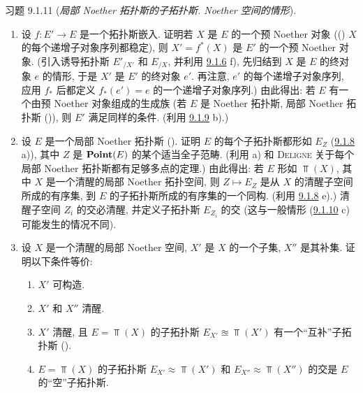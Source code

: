 \begin{enonce*}[remark]{习题 9.1.11}
(\emph{局部 Noether 拓扑斯的子拓扑斯. Noether 空间的情形}).
\begin{enumerate}
\renewcommand{\theenumi}{\alph{enumi}}
\renewcommand{\labelenumi}{\theenumi)}
\item 设 $f:E'\rightarrow E$ 是一个拓扑斯嵌入.
证明若 $X$ 是 $E$ 的一个预 Noether 对象
(\ie ()
$X$ 的每个递增子对象序列\pageoriginale 都稳定),
则 $X'=f^{\ast}(X)$ 是 $E'$ 的一个预 Noether 对象.
(引入诱导拓扑斯 ${E'}_{/X'}$ 和 $E_{/X}$,
并利用 \hyperref[IV.exer9.1.6]{9.1.6} f),
先归结到 $X$ 是 $E$ 的终对象 $e$ 的情形,
于是 $X'$ 是 $E'$ 的终对象 $e'$.
再注意, $e'$ 的每个递增子对象序列,
应用 $f_{\ast}$ 后都定义 $f_{\ast}(e')=e$ 的一个递增子对象序列.)
由此得出: 若 $E$ 有一个由预 Noether 对象组成的生成族
(\resp 若 $E$ 是 Noether 拓扑斯,
\resp 局部 Noether 拓扑斯 ()),
则 $E'$ 满足同样的条件.
(利用 \hyperref[IV.exer9.1.9]{9.1.9} b).)

\item 设 $E$ 是一个局部 Noether 拓扑斯
().
证明 $E$ 的每个子拓扑斯都形如 $E_Z$
(\hyperref[IV.exer9.1.8]{9.1.8} a)),
其中 $Z$ 是 $\operatorname{\mathbf{Point}}(E)$ 的某个适当全子范畴.
(利用 a) 和 \textsc{Deligne} 关于每个局部 Noether 拓扑斯都有足够多点的定理.)
由此得出: 若 $E$ 形如 $\Top(X)$,
其中 $X$ 是一个清醒的局部 Noether 拓扑空间,
则 $Z\mapsto E_Z$ 是从 $X$ 的清醒子空间所成的有序集,
到 $E$ 的子拓扑斯所成的有序集的一个同构.
(利用 \hyperref[IV.exer9.1.8]{9.1.8} e).)
清醒子空间 $Z_i$ 的交必清醒,
并定义子拓扑斯 $E_{Z_i}$ 的交
(这与一般情形 (\hyperref[IV.exer9.1.10]{9.1.10} c) 可能发生的情况不同).

\item 设 $X$ 是一个清醒的局部 Noether 空间,
$X'$ 是 $X$ 的一个子集, $X''$ 是其补集.
证明以下条件等价:
\begin{enumerate}
\renewcommand{\theenumii}{\roman{enumii}}
\renewcommand{\labelenumii}{(\theenumii)}
\item $X'$ 可构造.

\item $X'$ 和 $X''$ 清醒.

\item $X'$ 清醒, 且 $E=\Top(X)$ 的子拓扑斯
$E_{X'}\approxeq\Top(X')$ 有一个“互补”子拓扑斯
(\cf {}).

\item $E=\Top(X)$ 的子拓扑斯 $E_{X'}\approx\Top(X')$
和 $E_{X''}\approx\Top(X'')$ 的交是 $E$ 的“空”子拓扑斯.
\end{enumerate}


\end{enumerate}
\end{enonce*}
